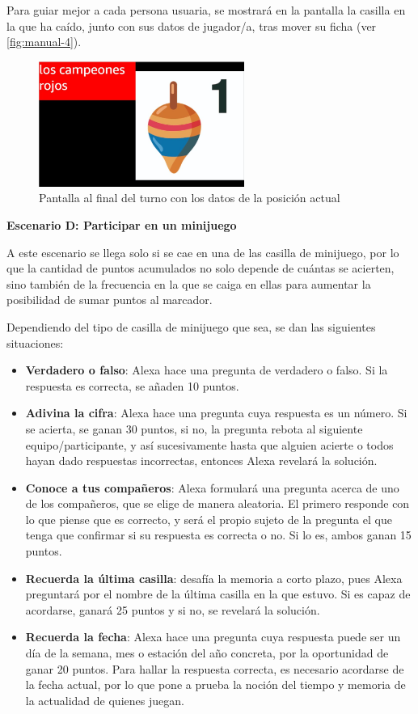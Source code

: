 Para guiar mejor a cada persona usuaria, se mostrará en la pantalla la casilla en la que ha caído, junto con sus datos de jugador/a, tras mover su ficha (ver \autoref{fig:manual-4}).
\begin{figure}[H]
	\centering
	\includegraphics[width=0.6\textwidth]{imgs/interfaz-4.JPG}
	\caption{Pantalla al final del turno con los datos de la posición actual}
	\label{fig:manual-4}
\end{figure}

\textbf{Escenario D: Participar en un minijuego}

A este escenario se llega solo si se cae en una de las casilla de minijuego, por lo que la cantidad de puntos acumulados no solo depende de cuántas se acierten, sino también de la frecuencia en la que se caiga en ellas para aumentar la posibilidad de sumar puntos al marcador.

Dependiendo del tipo de casilla de minijuego que sea, se dan las siguientes situaciones:
\begin{itemize}
	\item \textbf{Verdadero o falso}: Alexa hace una pregunta de verdadero o falso. Si la respuesta es correcta, se añaden 10 puntos.
	\item \textbf{Adivina la cifra}: Alexa hace una pregunta cuya respuesta es un número. Si se acierta, se ganan 30 puntos, si no, la pregunta rebota al siguiente equipo/participante, y así sucesivamente hasta que alguien acierte o todos hayan dado respuestas incorrectas, entonces Alexa revelará la solución.
	\item \textbf{Conoce a tus compañeros}: Alexa formulará una pregunta acerca de uno de los compañeros, que se elige de manera aleatoria. El primero responde con lo que piense que es correcto, y será el propio sujeto de la pregunta el que tenga que confirmar si su respuesta es correcta o no. Si lo es, ambos ganan 15 puntos.
	\item \textbf{Recuerda la última casilla}: desafía la memoria a corto plazo, pues Alexa preguntará por el nombre de la última casilla en la que estuvo. Si es capaz de acordarse, ganará 25 puntos y si no, se revelará la solución.
	\item \textbf{Recuerda la fecha}: Alexa hace una pregunta cuya respuesta puede ser un día de la semana, mes o estación del año concreta, por la oportunidad de ganar 20 puntos. Para hallar la respuesta correcta, es necesario acordarse de la fecha actual, por lo que pone a prueba la noción del tiempo y memoria de la actualidad de quienes juegan.
\end{itemize}

